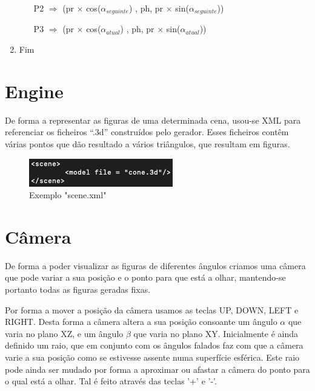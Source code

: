 \documentclass[a4paper]{article}
\begin{document}
\begin{enumerate}
\begin{enumerate}
        \hspace{0.5cm} P2 $\Rightarrow$ (pr $\times$ cos($\alpha_{seguinte}$) , ph, pr $\times$ sin($\alpha_{seguinte}$))

    \vspace{0.2cm}

        \hspace{1cm} P3 $\Rightarrow$ (pr $\times$ cos($\alpha_{atual}$) , ph, pr $\times$ sin($\alpha_{atual}$))

    \vspace{0.3cm}

  \end{enumerate}

  \item Fim
\end{enumerate}
\rmfamily

\newpage

\section{Engine}
\label{sec:engine}
De forma a representar as figuras de uma determinada cena, usou-se XML para referenciar os ficheiros “.3d” construídos pelo gerador. Esses ficheiros contêm várias pontos que dão resultado a vários triângulos, que resultam em figuras.

\begin{figure}[H]
\centering
\includegraphics[scale=0.70]{scene_xml.png}
\caption{Exemplo "scene.xml"}
\label{img:scene}
\end{figure}

\section{Câmera}
\label{sec:camera}
De forma a poder visualizar as figuras de diferentes ângulos criamos uma câmera que pode variar a sua posição e o ponto para que está a olhar, mantendo-se portanto todas as figuras geradas fixas.

Por forma a mover a posição da câmera usamos as teclas UP, DOWN, LEFT e RIGHT. Desta forma a câmera altera a sua posição consoante um ângulo $\alpha$ que varia no plano XZ, e um ângulo $\beta$ que varia no plano XY. Inicialmente é ainda definido um raio, que em conjunto com os ângulos falados faz com que a câmera varie a sua posição como se estivesse assente numa superfície esférica. Este raio pode ainda ser mudado por forma a aproximar ou afastar a câmera do ponto para o qual está a olhar. Tal é feito através das teclas '+' e '-'.
\end{document}
